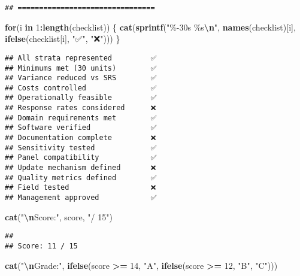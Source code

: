 \documentclass[
]{article}
\newenvironment{Shaded}{\begin{snugshade}}{\end{snugshade}}
\newcommand{\ControlFlowTok}[1]{\textcolor[rgb]{0.13,0.29,0.53}{\textbf{#1}}}
\newcommand{\DecValTok}[1]{\textcolor[rgb]{0.00,0.00,0.81}{#1}}
\newcommand{\FunctionTok}[1]{\textcolor[rgb]{0.13,0.29,0.53}{\textbf{#1}}}
\newcommand{\NormalTok}[1]{#1}
\newcommand{\SpecialCharTok}[1]{\textcolor[rgb]{0.81,0.36,0.00}{\textbf{#1}}}
\newcommand{\StringTok}[1]{\textcolor[rgb]{0.31,0.60,0.02}{#1}}
\begin{document}
\begin{verbatim}
## ================================
\end{verbatim}

\begin{Shaded}
\begin{Highlighting}[]
\ControlFlowTok{for}\NormalTok{(i }\ControlFlowTok{in} \DecValTok{1}\SpecialCharTok{:}\FunctionTok{length}\NormalTok{(checklist)) \{}
  \FunctionTok{cat}\NormalTok{(}\FunctionTok{sprintf}\NormalTok{(}\StringTok{"\%{-}30s \%s}\SpecialCharTok{\textbackslash{}n}\StringTok{"}\NormalTok{, }
              \FunctionTok{names}\NormalTok{(checklist)[i], }
              \FunctionTok{ifelse}\NormalTok{(checklist[i], }\StringTok{"✅"}\NormalTok{, }\StringTok{"❌"}\NormalTok{)))}
\NormalTok{\}}
\end{Highlighting}
\end{Shaded}

\begin{verbatim}
## All strata represented         ✅
## Minimums met (30 units)        ✅
## Variance reduced vs SRS        ✅
## Costs controlled               ✅
## Operationally feasible         ✅
## Response rates considered      ❌
## Domain requirements met        ✅
## Software verified              ✅
## Documentation complete         ❌
## Sensitivity tested             ✅
## Panel compatibility            ✅
## Update mechanism defined       ❌
## Quality metrics defined        ✅
## Field tested                   ❌
## Management approved            ✅
\end{verbatim}

\begin{Shaded}
\begin{Highlighting}[]
\FunctionTok{cat}\NormalTok{(}\StringTok{"}\SpecialCharTok{\textbackslash{}n}\StringTok{Score:"}\NormalTok{, score, }\StringTok{"/ 15"}\NormalTok{)}
\end{Highlighting}
\end{Shaded}

\begin{verbatim}
## 
## Score: 11 / 15
\end{verbatim}

\begin{Shaded}
\begin{Highlighting}[]
\FunctionTok{cat}\NormalTok{(}\StringTok{"}\SpecialCharTok{\textbackslash{}n}\StringTok{Grade:"}\NormalTok{, }\FunctionTok{ifelse}\NormalTok{(score }\SpecialCharTok{\textgreater{}=} \DecValTok{14}\NormalTok{, }\StringTok{"A"}\NormalTok{, }
                       \FunctionTok{ifelse}\NormalTok{(score }\SpecialCharTok{\textgreater{}=} \DecValTok{12}\NormalTok{, }\StringTok{"B"}\NormalTok{, }\StringTok{"C"}\NormalTok{)))}
\end{Highlighting}
\end{Shaded}
\end{document}
